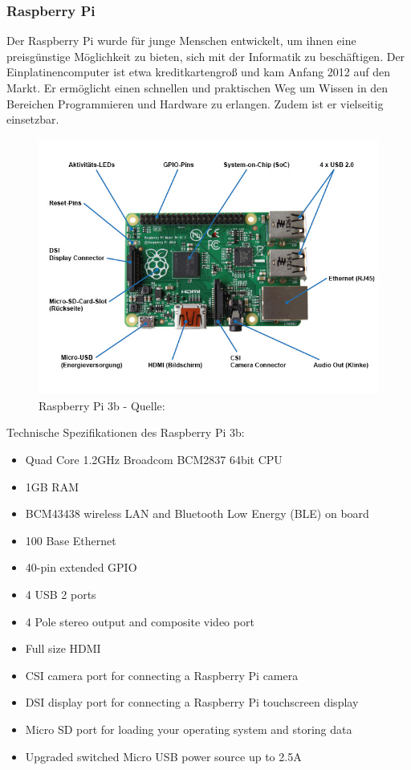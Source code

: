 \documentclass[a4paper,11pt,singlespacing]{article}
\begin{document}
    		\subsubsection{Raspberry Pi}
    			Der Raspberry Pi wurde für junge Menschen entwickelt, um ihnen eine preisgünstige Möglichkeit zu bieten, sich mit der Informatik zu beschäftigen. Der Einplatinencomputer ist etwa kreditkartengroß und kam Anfang 2012 auf den Markt. Er ermöglicht einen schnellen und praktischen Weg um Wissen in den Bereichen Programmieren und Hardware zu erlangen. Zudem ist er vielseitig einsetzbar.
    			\begin{figure}[H]
    				\centering
	    			\includegraphics[scale=0.5]{raspberry_pi_3b}
	    				\caption{Raspberry Pi 3b - Quelle: \cite{Picture_Raspberrypi3b} }
	    				\label{raspberrypi3b}
				\end{figure}
				Technische Spezifikationen des Raspberry Pi 3b:
				\begin{itemize}
					\item Quad Core 1.2GHz Broadcom BCM2837 64bit CPU
					\item 1GB RAM
					\item BCM43438 wireless LAN and Bluetooth Low Energy (BLE) on board
					\item 100 Base Ethernet
					\item 40-pin extended GPIO
					\item 4 USB 2 ports
					\item 4 Pole stereo output and composite video port
					\item Full size HDMI
					\item CSI camera port for connecting a Raspberry Pi camera
					\item DSI display port for connecting a Raspberry Pi touchscreen display
					\item Micro SD port for loading your operating system and storing data
					\item Upgraded switched Micro USB power source up to 2.5A  \cite{Quote_Raspberrypi3b}
				\end{itemize}
\end{document}

